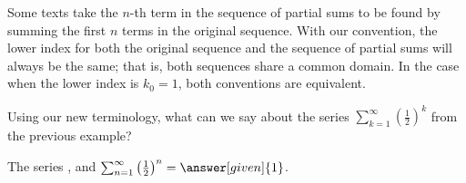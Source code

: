 \documentclass{ximera}
\begin{document}
\begin{remark}
Some texts take the $n$-th term in the sequence of partial sums to be found by summing the first $n$ terms in the original sequence.  With our convention, the lower index for both the original sequence and the sequence of partial sums will always be the same; that is, both sequences share a common domain.  In the case when the lower index is $k_0=1$, both conventions are equivalent.
\end{remark}

\begin{question}
  Using our new terminology, what can we say about the series $\sum_{k=1}^\infty \left(\frac{1}{2}\right)^k$ from the previous example?  \begin{prompt}The series     , and
      $\sum_{n=1}^\infty \left(\frac{1}{2}\right)^n = \answer[given]{1}$.
  \end{prompt}
\end{question}
%
%
%

\end{document}
